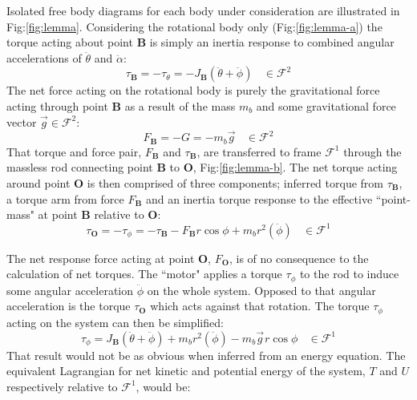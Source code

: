 \par
Isolated free body diagrams for each body under consideration are illustrated in Fig:\ref{fig:lemma}. Considering the rotational body only (Fig:\ref{fig:lemma-a}) the torque acting about point $\mathbf{B}$ is simply an inertia response to combined angular accelerations of $\ddot{\theta}$ and $\ddot{\alpha}$:
\begin{equation}
\tau_\mathbf{B}=-\tau_\theta=-J_\mathbf{B}(\ddot{\theta}+\ddot{\phi})~~~~\in\mathcal{F}^2
\end{equation}
The net force acting on the rotational body is purely the gravitational force acting through point $\mathbf{B}$ as a result of the mass $m_b$ and some gravitational force vector $\vec{g}\in\mathcal{F}^2$:
\begin{equation}
F_\mathbf{B}=-G=-m_b\vec{g}~~~~\in\mathcal{F}^2
\end{equation}
That torque and force pair, $F_\mathbf{B}$ and $\tau_\mathbf{B}$, are transferred to frame $\mathcal{F}^1$ through the massless rod connecting point $\mathbf{B}$ to $\mathbf{O}$, Fig:\ref{fig:lemma-b}. The net torque acting around point $\mathbf{O}$ is then comprised of three components; inferred torque from $\tau_\mathbf{B}$, a torque arm from force $F_\mathbf{B}$ and an inertia torque response to the effective ``point-mass" at point $\mathbf{B}$ relative to $\mathbf{O}$:
\begin{equation}
\tau_\mathbf{O}=-\tau_\phi=-\tau_\mathbf{B}-F_\mathbf{B}r\cos{\phi}+m_br^2(\ddot{\phi})~~~~\in\mathcal{F}^1
\end{equation}
\par
The net response force acting at point $\mathbf{O}$, $F_\mathbf{O}$, is of no consequence to the calculation of net torques. The ``motor" applies a torque $\tau_\phi$ to the rod to induce some angular acceleration $\ddot{\phi}$ on the whole system. Opposed to that angular acceleration is the torque $\tau_\mathbf{O}$ which acts against that rotation. The torque $\tau_\phi$ acting on the system can then be simplified:
\begin{equation}
\tau_\phi=J_\mathbf{B}(\ddot{\theta}+\ddot{\phi})+m_br^2(\ddot{\phi})-m_b\vec{g}\hspace{1pt}r\cos\phi~~~~\in\mathcal{F}^1
\end{equation}
That result would not be as obvious when inferred from an energy equation. The equivalent Lagrangian for net kinetic and potential energy of the system, $T$ and $U$ respectively relative to $\mathcal{F}^1$, would be:
